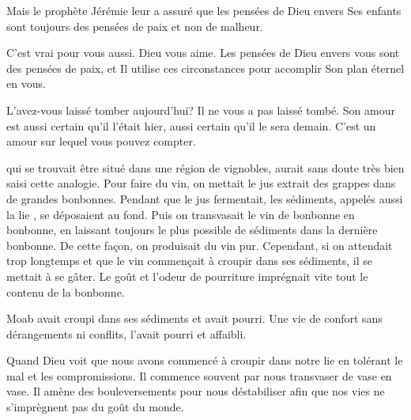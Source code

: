 Mais le prophète Jérémie leur a assuré que les pensées de Dieu envers
 Ses enfants sont toujours des pensées de paix et non de malheur. 

C'est vrai pour vous aussi. Dieu vous aime.
 Les pensées de Dieu envers vous sont des pensées de paix,
 et Il utilise ces circonstances pour accomplir Son plan éternel en vous. 

L'avez-vous laissé tomber aujourd'hui? Il ne vous a pas laissé tombé.
 Son amour est aussi certain qu'il l'était hier,
 aussi certain qu'il le sera demain.
 C'est un amour sur lequel vous pouvez compter. 

\dvrule







 qui se trouvait être situé
 dans une région de vignobles, aurait sans doute très bien saisi
 cette analogie. Pour faire du vin, on mettait le jus extrait des grappes
 dans de grandes bonbonnes. Pendant que le jus fermentait, les sédiments,
 appelés aussi \og la lie \fg{}, se déposaient au fond.
 Puis on transvasait le vin de bonbonne en bonbonne, en laissant toujours
 le plus possible de sédiments dans la dernière bonbonne.
 De cette façon, on produisait du vin pur.
 Cependant, si on attendait trop longtemps et que le vin commençait à croupir
 dans ses sédiments, il se mettait à se gâter.
 Le goût et l'odeur de pourriture imprégnait vite tout le contenu
 de la bonbonne. 

Moab avait croupi dans ses sédiments et avait pourri.
 Une vie de confort sans dérangements ni conflits, l'avait pourri et affaibli. 

Quand Dieu voit que nous avons commencé à croupir dans notre lie
 en tolérant le mal et les compromissions.
 Il commence souvent par nous transvaser de vase en vase.
 Il amène des bouleversements pour nous déstabiliser afin que nos vies
 ne s'imprègnent pas du goût du monde. 

